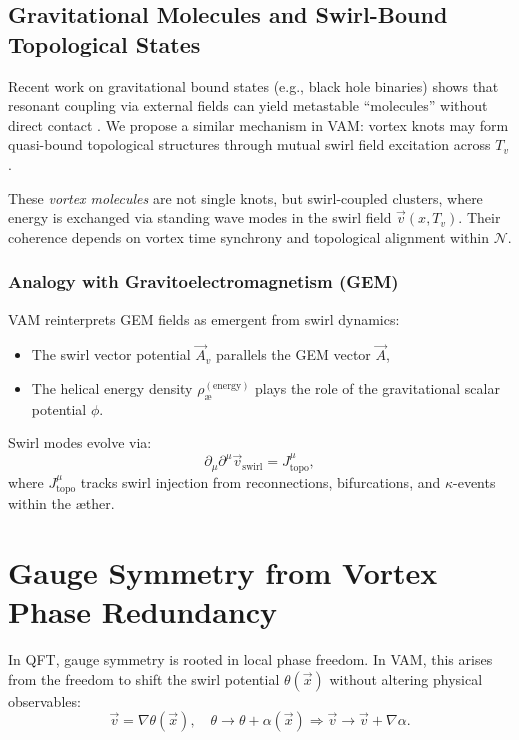 \subsection{Gravitational Molecules and Swirl-Bound Topological States}

Recent work on gravitational bound states (e.g., black hole binaries) shows that resonant coupling via external fields can yield metastable “molecules” without direct contact \cite{baumann2023black}. We propose a similar mechanism in VAM: vortex knots may form quasi-bound topological structures through mutual swirl field excitation across \( T_v \).

These \textit{vortex molecules} are not single knots, but swirl-coupled clusters, where energy is exchanged via standing wave modes in the swirl field \( \vec{v}(x, T_v) \). Their coherence depends on vortex time synchrony and topological alignment within $\mathcal{N}$.

\subsubsection*{Analogy with Gravitoelectromagnetism (GEM)}

VAM reinterprets GEM fields as emergent from swirl dynamics:
\begin{itemize}
  \item The swirl vector potential \( \vec{A}_v \) parallels the GEM vector \( \vec{A} \),
  \item The helical energy density \( \rho_\text{\ae}^{(\text{energy})} \) plays the role of the gravitational scalar potential \( \phi \).
\end{itemize}

Swirl modes evolve via:
\[
\partial_\mu \partial^\mu \vec{v}_\text{swirl} = J^\mu_\text{topo},
\]
where \( J^\mu_\text{topo} \) tracks swirl injection from reconnections, bifurcations, and $ \kappa $-events within the æther.

\section*{Gauge Symmetry from Vortex Phase Redundancy}

In QFT, gauge symmetry is rooted in local phase freedom. In VAM, this arises from the freedom to shift the swirl potential \( \theta(\vec{x}) \) without altering physical observables:
\[
\vec{v} = \nabla \theta(\vec{x}), \quad \theta \to \theta + \alpha(\vec{x}) \Rightarrow \vec{v} \to \vec{v} + \nabla \alpha.
\]

